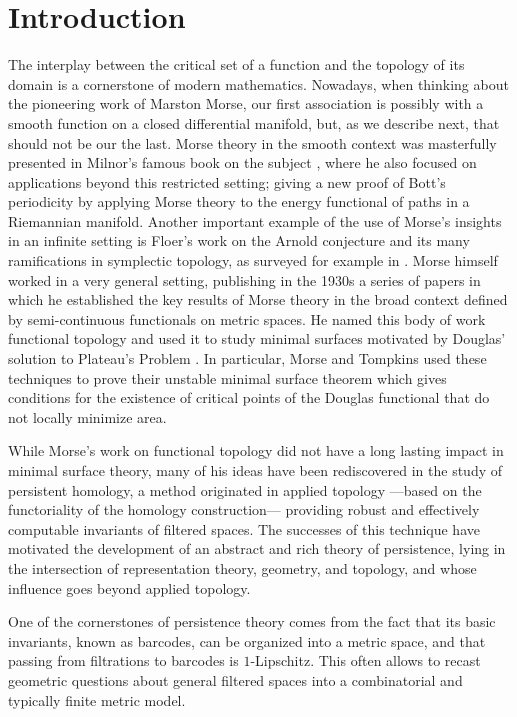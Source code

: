 
\section{Introduction}

The interplay between the critical set of a function and the topology of its domain is a cornerstone of modern mathematics.
Nowadays, when thinking about the pioneering work of Marston Morse, our first association is possibly with a smooth function on a closed differential manifold, but, as we describe next, that should not be our the last.
Morse theory in the smooth context was masterfully presented in Milnor's famous book on the subject \cite{MR0163331}, where he also focused on applications beyond this restricted setting;
giving a new proof of Bott's periodicity by applying Morse theory to the energy functional of paths in a Riemannian manifold.
Another important example of the use of Morse's insights in an infinite setting is Floer's work on the Arnold conjecture and its many ramifications in symplectic topology, as surveyed for example in \cite{MR1702944}.
Morse himself worked in a very general setting, publishing in the 1930s a series of papers \cite{Morse.1937, Morse.1938, Morse.1940, MR9102} in which he established the key results of Morse theory in the broad context defined by semi-continuous functionals on metric spaces.
He named this body of work functional topology and used it to study minimal surfaces motivated by Douglas' solution to Plateau’s Problem \cite{Douglas.1931}.
In particular, Morse and Tompkins \cite{Morse.1939, Morse.1941} used these techniques to prove their unstable minimal surface theorem which gives conditions for the existence of critical points of the Douglas functional that do not locally minimize area.

While Morse's work on functional topology did not have a long lasting impact in minimal surface theory, many of his ideas have been rediscovered in the study of persistent homology, a method originated in applied topology ---based on the functoriality of the homology construction--- providing robust and effectively computable invariants of filtered spaces.
The successes of this technique have motivated the development of an abstract and rich theory of persistence, lying in the intersection of representation theory, geometry, and topology, and whose influence goes beyond applied topology.

One of the cornerstones of persistence theory comes from the fact that its basic invariants, known as barcodes, can be organized into a metric space, and that passing from filtrations to barcodes is $1$-Lipschitz.
This often allows to recast geometric questions about general filtered spaces into a combinatorial and typically finite metric model.

